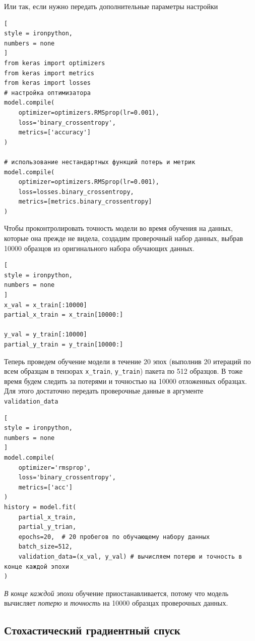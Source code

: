\documentclass[%
	11pt,
	a4paper,
	utf8,
		]{article}
\begin{document}
Или так, если нужно передать дополнительные параметры настройки
\begin{lstlisting}[
style = ironpython,
numbers = none
]
from keras import optimizers
from keras import metrics
from keras import losses
# настройка оптимизатора
model.compile(
    optimizer=optimizers.RMSprop(lr=0.001),
    loss='binary_crossentropy',
    metrics=['accuracy']
)

# использование нестандартных функций потерь и метрик
model.compile(
    optimizer=optimizers.RMSprop(lr=0.001),
    loss=losses.binary_crossentropy,
    metrics=[metrics.binary_crossentropy]
)
\end{lstlisting}

Чтобы проконтролировать точность модели во время обучения на данных, которые она прежде не видела, создадим проверочный набор данных, выбрав 10000 образцов из оригинального набора обучающих данных.
\begin{lstlisting}[
style = ironpython,
numbers = none
]
x_val = x_train[:10000]
partial_x_train = x_train[10000:]

y_val = y_train[:10000]
partial_y_train = y_train[10000:]
\end{lstlisting}

Теперь  проведем обучение модели в течение 20 эпох (выполнив 20 итераций по всем образцам в тензорах \texttt{x\_train}, \texttt{y\_train}) пакета по 512 образцов. В тоже время будем следить за потерями и точностью на 10000 отложенных образцах. Для этого достаточно передать проверочные данные в аргументе \texttt{validation\_data}
\begin{lstlisting}[
style = ironpython,
numbers = none
]
model.compile(
    optimizer='rmsprop',
    loss='binary_crossentropy',
    metrics=['acc']
)
history = model.fit(
    partial_x_train,
    partial_y_trian,
    epochs=20,  # 20 пробегов по обучающему набору данных
    batch_size=512,
    validation_data=(x_val, y_val) # вычисляем потерю и точность в конце каждой эпохи
)
\end{lstlisting}

\emph{В конце каждой эпохи} обучение приостанавливается, потому что модель вычисляет \emph{потерю} и \emph{точность} на 10000 образцах проверочных данных.

\subsection{Стохастический градиентный спуск}
\end{document}
